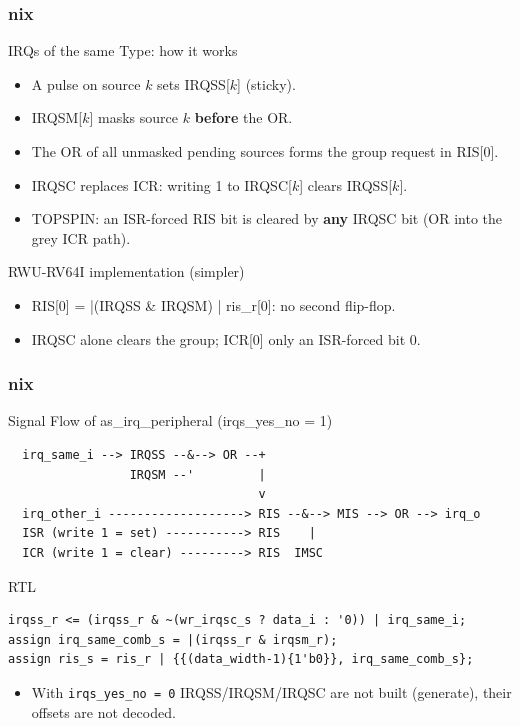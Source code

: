 \documentclass{beamer}
\newcommand{\astitle}{nix}
\newcommand{\assubtitle}{nix}
\newcommand{\cmd}[1]{\texttt{#1}}
\begin{document}
\renewcommand{\assubtitle}{IRQs of the same Type: how it works}
\begin{frame}
\frametitle{\astitle}
\begin{block}{\assubtitle}
  \begin{itemize}
    \item A pulse on source $k$ sets IRQSS[$k$] (sticky).
    \item IRQSM[$k$] masks source $k$ \textbf{before} the OR.
    \item The OR of all unmasked pending sources forms the group request in RIS[0].
    \item IRQSC replaces ICR: writing 1 to IRQSC[$k$] clears IRQSS[$k$].
    \item TOPSPIN: an ISR-forced RIS bit is cleared by \textbf{any} IRQSC bit
      (OR into the grey ICR path).
  \end{itemize}
\end{block}
\begin{block}{RWU-RV64I implementation (simpler)}
  \begin{itemize}
    \item RIS[0] = |(IRQSS \& IRQSM) | ris\_r[0]: no second flip-flop.
    \item IRQSC alone clears the group; ICR[0] only an ISR-forced bit 0.
  \end{itemize}
\end{block}
\end{frame}

\renewcommand{\assubtitle}{Signal Flow of as\_irq\_peripheral (irqs\_yes\_no = 1)}
\begin{frame}[fragile]
\frametitle{\astitle}
\begin{block}{\assubtitle}
\begin{lstlisting}
  irq_same_i --> IRQSS --&--> OR --+
                 IRQSM --'         |
                                   v
  irq_other_i -------------------> RIS --&--> MIS --> OR --> irq_o
  ISR (write 1 = set) -----------> RIS    |
  ICR (write 1 = clear) ---------> RIS  IMSC
\end{lstlisting}
\end{block}
\begin{block}{RTL}
\begin{lstlisting}
irqss_r <= (irqss_r & ~(wr_irqsc_s ? data_i : '0)) | irq_same_i;
assign irq_same_comb_s = |(irqss_r & irqsm_r);
assign ris_s = ris_r | {{(data_width-1){1'b0}}, irq_same_comb_s};
\end{lstlisting}
\end{block}
  \begin{itemize}
    \item With \cmd{irqs\_yes\_no = 0} IRQSS/IRQSM/IRQSC are not built
      (generate), their offsets are not decoded.
  \end{itemize}
\end{frame}
\end{document}
